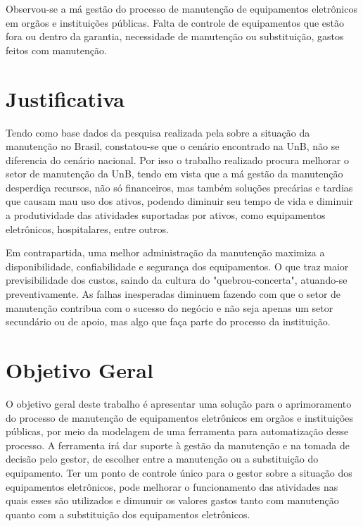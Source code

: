 Observou-se a má gestão do processo de manutenção de equipamentos eletrônicos em orgãos e instituições públicas. Falta de controle de equipamentos que estão fora ou dentro da garantia, necessidade de manutenção ou substituição, gastos feitos com manutenção.


\section{Justificativa}

Tendo como base dados da pesquisa realizada pela \cite{abraman} sobre a situação da manutenção no Brasil, constatou-se que o cenário encontrado na UnB, não se diferencia do cenário nacional. Por isso o trabalho realizado procura melhorar o setor de manutenção da UnB, tendo em vista que a má gestão da manutenção desperdiça recursos, não só financeiros, mas também soluções precárias e tardias que causam mau uso dos ativos, podendo diminuir seu tempo de vida e diminuir a produtividade das atividades suportadas por ativos, como equipamentos eletrônicos, hospitalares, entre outros.

Em contrapartida, uma melhor administração da manutenção maximiza a disponibilidade, confiabilidade e segurança dos equipamentos. O que traz maior previsibilidade dos custos, saindo da cultura do "quebrou-concerta", atuando-se preventivamente. As falhas inesperadas diminuem fazendo com que o setor de manutenção contribua com o sucesso do negócio e não seja apenas um setor secundário ou de apoio, mas algo que faça parte do processo da instituição.



\section{Objetivo Geral}

O objetivo geral deste trabalho é apresentar uma solução para o aprimoramento do processo de manutenção de equipamentos eletrônicos em orgãos e instituições públicas, por meio da modelagem de uma ferramenta para automatização desse processo. A ferramenta irá dar suporte à gestão da manutenção e na tomada de decisão pelo gestor, de escolher entre a manutenção ou a substituição do equipamento. Ter um ponto de controle único para o gestor sobre a situação dos equipamentos eletrônicos, pode melhorar o funcionamento das atividades nas quais esses são utilizados e dimunuir os valores gastos tanto com manutenção quanto com a substituição dos equipamentos eletrônicos.

